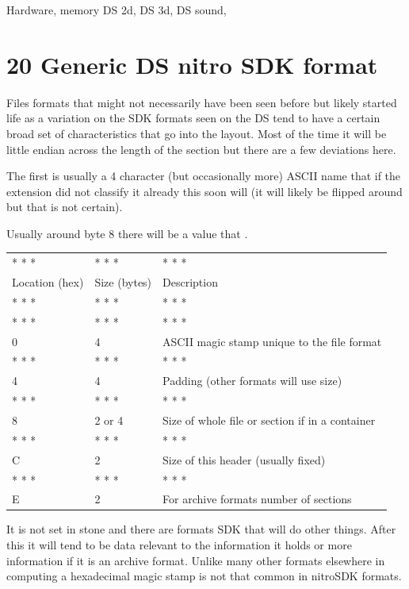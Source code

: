\documentclass[
]{book}
\begin{document}
Hardware, memory DS 2d, DS 3d, DS sound,

\hypertarget{generic-ds-nitro-sdk-format}{%
\chapter{20 Generic DS nitro SDK format}\label{generic-ds-nitro-sdk-format}}

Files formats that might not necessarily have been seen before but likely started life as a variation on the SDK formats seen on the DS tend to have a certain broad set of characteristics that go into the layout. Most of the time it will be little endian across the length of the section but there are a few deviations here.

The first is usually a 4 character (but occasionally more) ASCII name that if the extension did not classify it already this soon will (it will likely be flipped around but that is not certain).

Usually around byte 8 there will be a value that .

\begin{longtable}[]{@{}lll@{}}
\toprule()
\endhead
* * * & * * * & * * * \\
Location (hex) & Size (bytes) & Description \\
* * * & * * * & * * * \\
* * * & * * * & * * * \\
0 & 4 & ASCII magic stamp unique to the file format \\
* * * & * * * & * * * \\
4 & 4 & Padding (other formats will use size) \\
* * * & * * * & * * * \\
8 & 2 or 4 & Size of whole file or section if in a container \\
* * * & * * * & * * * \\
C & 2 & Size of this header (usually fixed) \\
* * * & * * * & * * * \\
E & 2 & For archive formats number of sections \\
\bottomrule()
\end{longtable}

It is not set in stone and there are formats SDK that will do other things. After this it will tend to be data relevant to the information it holds or more information if it is an archive format. Unlike many other formats elsewhere in computing a hexadecimal magic stamp is not that common in nitroSDK formats.
\end{document}
